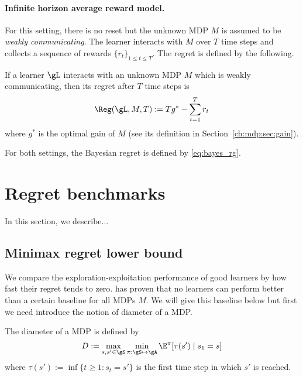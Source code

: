 \paragraph{Infinite horizon average reward model.}
For this setting, there is no reset but the unknown MDP $M$ is assumed to be \emph{weakly communicating}.
The learner interacts with $M$ over $T$ time steps and collects a sequence of rewards $\{r_t\}_{1\le t\le T}$.
The regret is defined by the following.
\begin{defn}
    \label{defn:rg_infinite}
    If a learner $\gL$ interacts with an unknown MDP $M$ which is weakly communicating, then its regret after $T$ time steps is
    \begin{equation}
        \label{eq:rg_finite}
        \Reg(\gL, M, T):= Tg^* -\sum_{t=1}^Tr_t
    \end{equation}
    where $g^*$ is the optimal gain of $M$ (see its definition in Section~\ref{ch:mdp:sec:gain}).
\end{defn}

For both settings, the Bayesian regret is defined by \eqref{eq:bayes_rg}.

\section{Regret benchmarks}
\label{sec:rg_benchmark}

In this section, we describe... 

\subsection{Minimax regret lower bound}

We compare the exploration-exploitation performance of good learners by how fast their regret tends to zero.
\cite{jaksch2010near} has proven that no learners can perform better than a certain baseline for all MDPs $M$.
We will give this baseline below but first we need introduce the notion of diameter of a MDP.
\begin{defn}
    The diameter of a MDP is defined by
    \begin{equation}
        \label{eq:diameter}
        D := \max_{s,s'\in\gS}\min_{\pi:\gS\mapsto\gA} \E^\pi[\tau(s') \mid s_1=s]
    \end{equation}
    where $\tau(s'):=\inf\{t\ge1 : s_t=s'\}$ is the first time step in which $s'$ is reached.
\end{defn}





